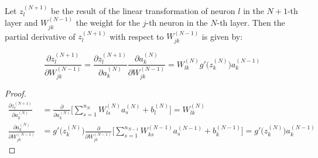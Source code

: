 \begin{remark}\label{rem:chain_rule}
	Let $z_l^{(N+1)}$ be the result of the linear transformation of neuron $l$ in the $N+1$-th layer and $W_{jk}^{(N-1)}$ the weight for the $j$-th neuron in the $N$-th layer. Then the partial derivative of $z_l^{(N+1)}$ with respect to $W_{jk}^{(N-1)}$ is given by:
	
	\begin{equation}
		\frac{\partial z_l^{(N+1)}}{\partial W_{jk}^{(N-1)}} = \frac{\partial z_l^{(N+1)}}{\partial a_k^{(N)}}\frac{\partial a_k^{(N)}}{\partial W_{jk}^{(N-1)}} = W_{lk}^{(N)} g' \big( z_k^{(N)}\big) a_k^{(N-1)}
	\end{equation}
	
	\begin{proof}
		\begin{align*}
			\frac{\partial z_l^{(N+1)}}{\partial a_k^{(N)}} &= \frac{\partial}{\partial a_k^{(N)}} \bigg[ \sum_{s=1}^{n_N} W_{ls}^{(N)}a_s^{(N)} + b_l^{(N)} \bigg] = W_{lk}^{(N)} \\
			\frac{\partial a_k^{(N)}}{\partial W_{jk}^{(N-1)}} &= g' \big( z_k^{(N)}\big) \frac{\partial}{\partial W_{jk}^{(N-1)}} \bigg[ \sum_{s=1}^{n_{N-1}} W_{ks}^{(N-1)}a_s^{(N-1)} + b_k^{(N-1)} \bigg]= g' \big( z_k^{(N)}\big) a_k^{(N-1)}
		\end{align*}
	\end{proof}
\end{remark}

